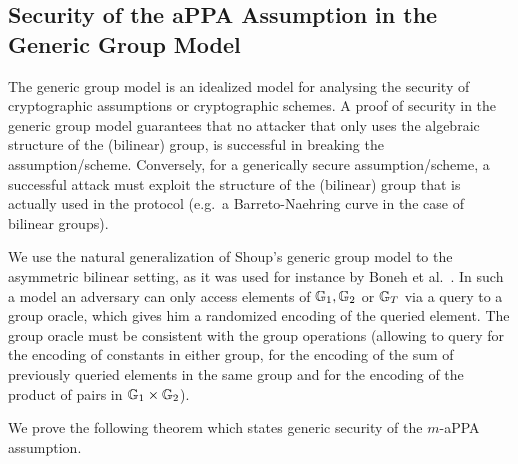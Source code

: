 \subsection{Security of the aPPA Assumption in the Generic Group Model}

The generic group model is an idealized model for analysing the security of cryptographic assumptions or cryptographic schemes. A proof of security in the generic group model guarantees that no attacker that only uses the algebraic structure of the (bilinear) group, is successful in breaking the assumption/scheme. Conversely, for a generically secure assumption/scheme, a successful attack must exploit the structure of the (bilinear) group that is actually used in the protocol (e.g.~a Barreto-Naehring curve in the case of bilinear groups).  

We use the natural generalization of Shoup's generic group model \cite{EC:Shoup97} to the asymmetric bilinear setting, as it was used for instance by Boneh et al.~\cite{EC:BonBoyGoh05}. In such a model an adversary can only access elements of $\mathbb{G}_1,\mathbb{G}_2$ or $\mathbb{G}_T$ via a query to a group oracle, which gives him a randomized  encoding of the queried element. The group oracle must be consistent with the group operations (allowing to query for the encoding of constants in either group, for the encoding of the sum of previously queried elements in the same group and for the encoding of the product of pairs in $\mathbb{G}_1\times \mathbb{G}_2$).

We prove the following theorem which states generic security of the $m$-aPPA assumption.


